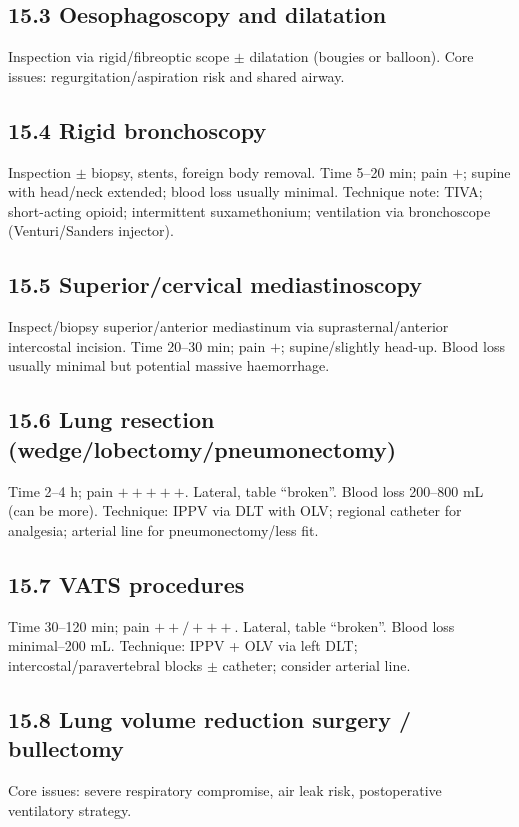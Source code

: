 \documentclass[11pt,a4paper]{article}
\begin{document}
\subsection{15.3 Oesophagoscopy and dilatation}
Inspection via rigid/fibreoptic scope \(\pm\) dilatation (bougies or balloon). Core issues: regurgitation/aspiration risk and shared airway.

\subsection{15.4 Rigid bronchoscopy}
Inspection \(\pm\) biopsy, stents, foreign body removal. Time 5--20 min; pain \(+\); supine with head/neck extended; blood loss usually minimal. Technique note: TIVA; short-acting opioid; intermittent suxamethonium; ventilation via bronchoscope (Venturi/Sanders injector).

\subsection{15.5 Superior/cervical mediastinoscopy}
Inspect/biopsy superior/anterior mediastinum via suprasternal/anterior intercostal incision. Time 20--30 min; pain \(+\); supine/slightly head-up. Blood loss usually minimal but potential massive haemorrhage.

\subsection{15.6 Lung resection (wedge/lobectomy/pneumonectomy)}
Time 2--4 h; pain \(+++++\). Lateral, table ``broken''. Blood loss 200--800 mL (can be more). Technique: IPPV via DLT with OLV; regional catheter for analgesia; arterial line for pneumonectomy/less fit.

\subsection{15.7 VATS procedures}
Time 30--120 min; pain \(++/+++\). Lateral, table ``broken''. Blood loss minimal--200 mL. Technique: IPPV + OLV via left DLT; intercostal/paravertebral blocks \(\pm\) catheter; consider arterial line.

\subsection{15.8 Lung volume reduction surgery / bullectomy}
Core issues: severe respiratory compromise, air leak risk, postoperative ventilatory strategy.
\end{document}
